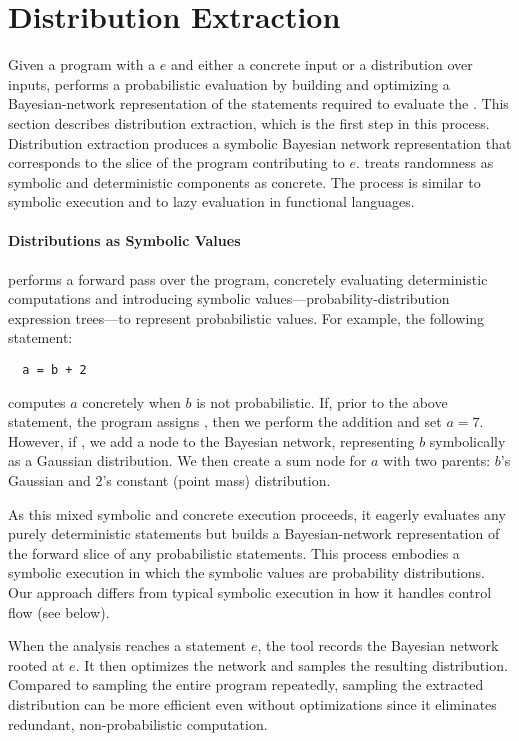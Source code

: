 \section{Distribution Extraction} 
\label{passert:sec:distex}


Given a program with a \passert $e$ and either a concrete input or a
distribution over inputs,
\tool performs a probabilistic evaluation
by building and optimizing a Bayesian-network representation of the statements
required to evaluate the \passert.  This section describes
distribution extraction, which is the first step in this process.
Distribution extraction produces a symbolic Bayesian network representation
that corresponds to the slice of the program contributing to $e$.
\tool treats randomness as symbolic and
deterministic components as concrete.
The process is similar to symbolic execution and to lazy evaluation in
functional languages.

\paragraph{Distributions as Symbolic Values}
\mayhap performs a forward pass over the program, concretely
evaluating deterministic computations and introducing symbolic
values---probability-distribution expression trees---to represent
probabilistic values. For example, the following statement: 
%
\begin{lstlisting}
  a = b + 2
\end{lstlisting}
%
computes $a$ concretely when $b$ is not probabilistic.  If, prior to the above
statement, the program assigns , then we perform the
addition and set $a=7$.  However, if , we
add a node to the Bayesian network, representing $b$
symbolically as a Gaussian distribution.  We then create a sum node for
$a$ with two parents: $b$'s Gaussian  and $2$'s constant (point mass) distribution.

As this mixed symbolic and concrete execution proceeds, it eagerly
evaluates any purely deterministic statements but builds a Bayesian-network
representation
of the forward slice of any probabilistic statements.  This
process embodies a symbolic execution in which the symbolic values are
probability distributions. Our approach differs from typical symbolic
execution
in how it handles control flow (see below).  

When the analysis reaches a statement \passert $e$, the tool records the Bayesian network
rooted at $e$. It then optimizes the network and samples the
resulting distribution.
Compared to sampling the entire program repeatedly, sampling the extracted
distribution can be more efficient even without optimizations since it
eliminates redundant, non-probabilistic
computation. 

